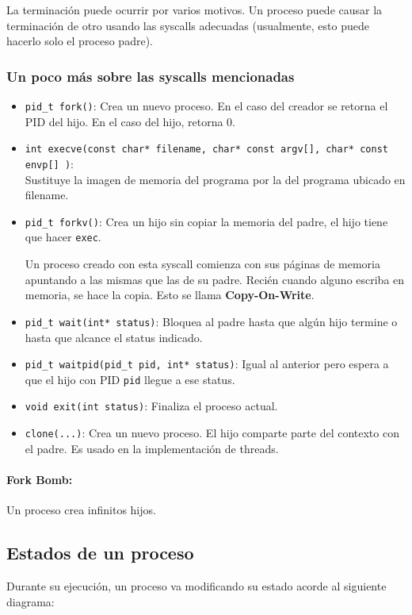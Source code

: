 La terminación puede ocurrir por varios motivos. Un proceso puede causar la terminación de otro usando las syscalls adecuadas (usualmente, esto puede hacerlo solo el proceso padre).

\subsubsection{Un poco más sobre las syscalls mencionadas}
\begin{itemize}
	\item \texttt{pid\_t fork()}: Crea un nuevo proceso. En el caso del creador se retorna el PID del hijo. En el caso del hijo, retorna 0.
	\item \texttt{int\ execve(const char* filename, char* const argv[], char* const envp[] )}: \\ Sustituye la imagen de memoria del programa por la del programa ubicado en filename.
	\item \texttt{pid\_t forkv()}: Crea un hijo sin copiar la memoria del padre, el hijo tiene que hacer \texttt{exec}.

	Un proceso creado con esta syscall comienza con sus páginas de memoria apuntando a las mismas que las de su padre. Recién cuando alguno escriba en memoria, se hace la copia. Esto se llama \textbf{Copy-On-Write}.

	\item \texttt{pid\_t wait(int* status)}: Bloquea al padre hasta que algún hijo termine o hasta que alcance el status indicado.
	\item \texttt{pid\_t waitpid(pid\_t pid, int* status)}: Igual al anterior pero espera a que el hijo con PID \texttt{pid} llegue a ese status.
	\item \texttt{void exit(int status)}: Finaliza el proceso actual.
	\item \texttt{clone(...)}: Crea un nuevo proceso. El hijo comparte parte del contexto con el padre. Es usado en la implementación de threads.
\end{itemize}

\paragraph{Fork Bomb:} Un proceso crea infinitos hijos.
\subsection{Estados de un proceso}\label{procesos::estados}
Durante su ejecución, un proceso va modificando su estado acorde al siguiente diagrama:


